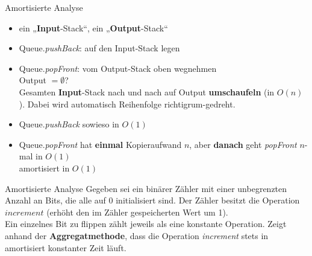 \begin{frame}{Amortisierte Analyse}
	 \solutionheading
	\begin{itemize}
		\item ein „\textbf{Input}-Stack“, ein „\textbf{Output}-Stack“
		\item Queue.\textit{pushBack}: auf den Input-Stack legen
		\item Queue.\textit{popFront}: vom Output-Stack oben wegnehmen \\ 
		\pause
			  Output $= \emptyset$? \\
			  \impl Gesamten \textbf{Input}-Stack nach und nach auf Output \textbf{umschaufeln} (in $O(n)$). Dabei wird automatisch Reihenfolge richtigrum-gedreht. 
		\pause
		\item Queue.\textit{pushBack} sowieso in $O(1)$
		\pause
		\item Queue.\textit{popFront} hat \textbf{einmal} Kopieraufwand $n$, aber \textbf{danach} geht \textit{popFront} $n$-mal in $O(1)$ \\
		\pause
		\impl amortisiert in $O(1)$
	\end{itemize}
\end{frame}




\begin{frame}{Amortisierte Analyse}
	Gegeben sei ein binärer Zähler mit einer unbegrenzten Anzahl an Bits, die alle auf 0 initialisiert sind. Der Zähler besitzt die Operation $increment$ (erhöht den im Zähler gespeicherten Wert um 1). \\ 
	\smallskip
	Ein einzelnes Bit zu flippen zählt jeweils als eine konstante Operation. Zeigt anhand der \textbf{Aggregatmethode}, dass die Operation \emph{increment} stets in amortisiert konstanter Zeit läuft.
\end{frame}

